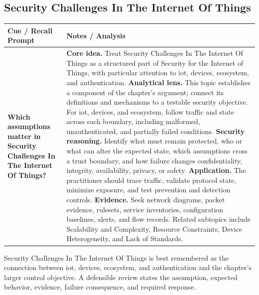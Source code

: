 \documentclass[11pt]{article}
\newcommand{\CornellHeader}{%
\rowcolor{Navy}\color{white}\bfseries Cue / Recall Prompt & \color{white}\bfseries Notes / Analysis\\\hline}
\newcommand{\CornellRow}[2]{%
\cellcolor{CueGray}\RaggedRight\textbf{#1} & \RaggedRight #2\\\hline}
\begin{document}
\subsection*{Security Challenges In The Internet Of Things}
\begin{longtable}{>{\RaggedRight\arraybackslash}p{}|>{\RaggedRight\arraybackslash}p{}}
\CornellHeader
\CornellRow{Which assumptions matter in Security Challenges In The Internet Of Things?}{\textbf{Core idea.} Treat Security Challenges In The Internet Of Things as a structured part of Security for the Internet of Things, with particular attention to iot, devices, ecosystem, and authentication. \textbf{Analytical lens.} This topic establishes a component of the chapter's argument; connect its definitions and mechanisms to a testable security objective. For iot, devices, and ecosystem, follow traffic and state across each boundary, including malformed, unauthenticated, and partially failed conditions. \textbf{Security reasoning.} Identify what must remain protected, who or what can alter the expected state, which assumptions cross a trust boundary, and how failure changes confidentiality, integrity, availability, privacy, or safety. \textbf{Application.} The practitioner should trace traffic, validate protocol state, minimize exposure, and test prevention and detection controls. \textbf{Evidence.} Seek network diagrams, packet evidence, rulesets, service inventories, configuration baselines, alerts, and flow records. Related subtopics include Scalability and Complexity, Resource Constraints, Device Heterogeneity, and Lack of Standards.}
\end{longtable}
\begin{topicsummary}
Security Challenges In The Internet Of Things is best remembered as the connection between iot, devices, ecosystem, and authentication and the chapter's larger control objective. A defensible review states the assumption, expected behavior, evidence, failure consequence, and required response.
\end{topicsummary}
\end{document}
